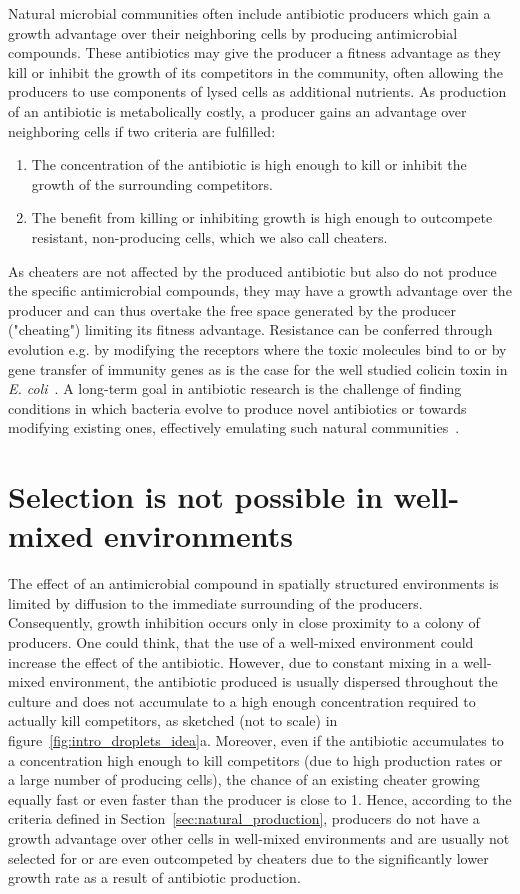 Natural microbial communities often include antibiotic producers which gain a growth advantage over their neighboring cells by producing antimicrobial compounds. These antibiotics may give the producer a fitness advantage as they kill or inhibit the growth of its competitors in the community, often allowing the producers to use components of lysed cells as additional nutrients.
As production of an antibiotic is metabolically costly, a producer gains an advantage over neighboring cells if two criteria are fulfilled:
\begin{enumerate}
\item The concentration of the antibiotic is high enough to kill or inhibit the growth of the surrounding competitors.
\item The benefit from killing or inhibiting growth is high enough to outcompete resistant, non-producing cells, which we also call cheaters.
\end{enumerate}
As cheaters are not affected by the produced antibiotic but also do not produce the specific antimicrobial compounds, they may have a growth advantage over the producer and can thus overtake the free space generated by the producer ("cheating") limiting its fitness advantage.
Resistance can be conferred through evolution e.g. by modifying the receptors where the toxic molecules bind to or by gene transfer of immunity genes as is the case for the well studied colicin toxin in \textit{E. coli}~\cite{Redericq2008-bn}.
A long-term goal in antibiotic research is the challenge of finding conditions in which bacteria evolve to produce novel antibiotics or towards modifying existing ones, effectively emulating such natural communities~\cite{Charusanti2012-uy}.

\section{Selection is not possible in well-mixed environments}

The effect of an antimicrobial compound in spatially structured environments is limited by diffusion to the immediate surrounding of the producers. Consequently, growth inhibition occurs only in close proximity to a colony of producers. One could think, that the use of a well-mixed environment could increase the effect of the antibiotic.
However, due to constant mixing in a well-mixed environment, the antibiotic produced is usually dispersed throughout the culture and does not accumulate to a high enough concentration required to actually kill competitors, as sketched (not to scale) in figure~\ref{fig:intro_droplets_idea}a. Moreover, even if the antibiotic accumulates to a concentration high enough to kill competitors (due to high production rates or a large number of producing cells), the chance of an existing cheater growing equally fast or even faster than the producer is close to 1.
Hence, according to the criteria defined in Section~\ref{sec:natural_production}, producers do not have a growth advantage over other cells in well-mixed environments and are usually not selected for or are even outcompeted by cheaters due to the significantly lower growth rate as a result of antibiotic production.

